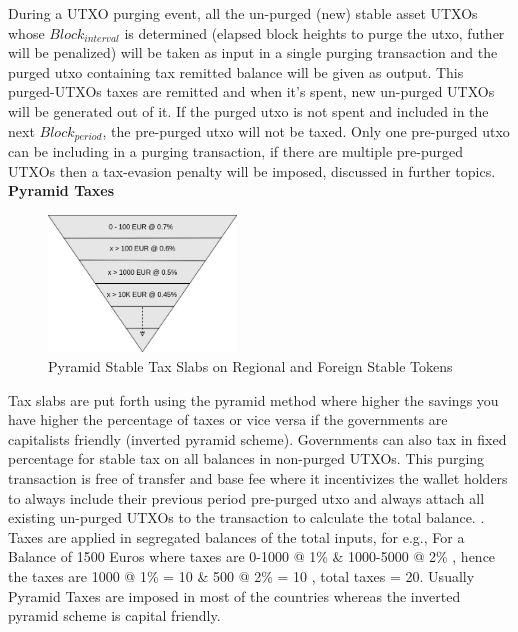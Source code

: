 \documentclass[letterpaper,11pt]{article}
\begin{document}
During a UTXO purging event, all the un-purged (new) stable asset UTXOs whose $Block_{interval}$ is determined (elapsed block heights to purge the utxo, futher will be penalized) will be taken as input in a single purging transaction and the purged utxo containing tax remitted balance will be given as output. This purged-UTXOs taxes are remitted and when it's spent, new un-purged UTXOs will be generated out of it. If the purged utxo is not spent and included in the next $Block_{period}$, the pre-purged utxo will not be taxed. Only one pre-purged utxo can be including in a purging transaction, if there are multiple pre-purged UTXOs then a tax-evasion penalty will be imposed, discussed in further topics.\\



\textbf{Pyramid Taxes}\\

\begin{figure}[H]
\begin{center}
\includegraphics[width=5cm]{invertedtriangle}
\caption{Pyramid Stable Tax Slabs on Regional and Foreign Stable Tokens}
\end{center}
\end{figure}

Tax slabs are put forth using the pyramid method where higher the savings you have higher the percentage of taxes or vice versa if the governments are capitalists friendly (inverted pyramid scheme). Governments can also tax in fixed percentage for stable tax on all balances in non-purged UTXOs. This purging transaction is free of transfer and base fee where it incentivizes the wallet holders to always include their previous period pre-purged utxo and always attach all existing un-purged UTXOs to the transaction to calculate the total balance. . Taxes are applied in segregated balances of the total inputs, for e.g., For a Balance of 1500 Euros where taxes are 0-1000 @ 1\% \& 1000-5000 @ 2\% , hence the taxes are 1000 @ 1\% = 10 \& 500 @ 2\% = 10 , total taxes = 20. Usually Pyramid Taxes are imposed in most of the countries whereas the inverted pyramid scheme is capital friendly. \\
\end{document}

